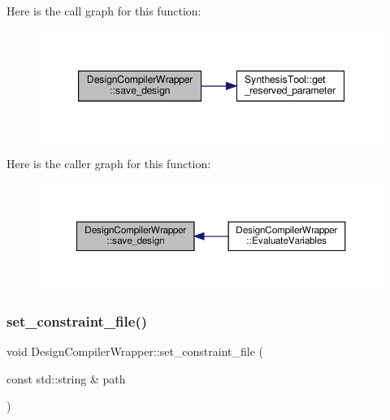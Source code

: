 Here is the call graph for this function\+:
\nopagebreak
\begin{figure}[H]
\begin{center}
\leavevmode
\includegraphics[width=347pt]{d5/d55/classDesignCompilerWrapper_aa16222c84633b1ad3acfa380c4b68a9b_cgraph}
\end{center}
\end{figure}
Here is the caller graph for this function\+:
\nopagebreak
\begin{figure}[H]
\begin{center}
\leavevmode
\includegraphics[width=350pt]{d5/d55/classDesignCompilerWrapper_aa16222c84633b1ad3acfa380c4b68a9b_icgraph}
\end{center}
\end{figure}
\mbox{\label{classDesignCompilerWrapper_a246af7f8521eebb6e97a2a66ae31939d}} 
\subsubsection{\texorpdfstring{set\+\_\+constraint\+\_\+file()}{set\_constraint\_file()}}
{\footnotesize\ttfamily void Design\+Compiler\+Wrapper\+::set\+\_\+constraint\+\_\+file (\begin{DoxyParamCaption}\item[{const std\+::string \&}]{path }\end{DoxyParamCaption})}



